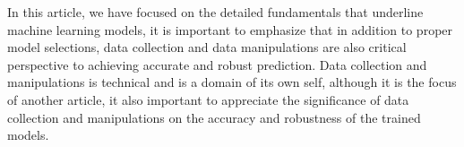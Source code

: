 
\par
In this article, we have focused on the detailed fundamentals that underline machine learning models, it is important to emphasize that in addition to proper model selections, data collection and data manipulations are also critical perspective to achieving accurate and robust prediction. Data collection and manipulations is technical and is a domain of its own self, although it is the focus of another article, it also important to appreciate the significance of data collection and manipulations on the accuracy and robustness of the trained models.
\par 
